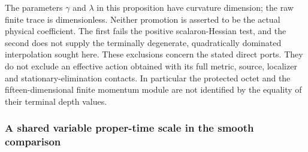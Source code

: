 \documentclass[12pt,a4paper]{article}
\begin{document}
The parameters \(\gamma\) and \(\lambda\) in this proposition have
curvature dimension; the raw finite trace is dimensionless.  Neither
promotion is asserted to be the actual physical coefficient.  The first
fails the positive scalaron-Hessian test, and the second does not supply
the terminally degenerate, quadratically dominated interpolation sought
here.  These exclusions concern the stated direct ports.  They do not
exclude an effective action obtained with its full metric, source,
localizer and stationary-elimination contacts.  In particular the
protected octet and the fifteen-dimensional finite momentum module are
not identified by the equality of their terminal depth values.

\subsubsection{A shared variable proper-time scale in the smooth comparison}
\end{document}
